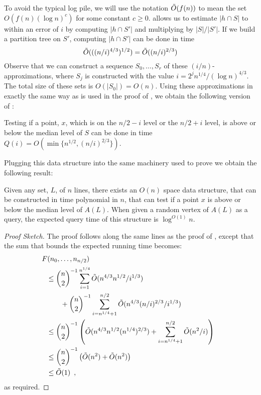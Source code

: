 \documentclass{cccg12}
\begin{document}
To avoid the typical log pile, we will use the notation $\tilde{O}(f(n))$
to mean the set $O(f(n)(\log n)^c)$ for some constant $c \ge 0$.
 allows us to estimate $|h\cap S|$ to within an error
of $i$ by computing $|h\cap S'|$ and multiplying by $|S|/|S'|$.  If we
build a partition tree on $S'$, computing $|h\cap S'|$ can be done in time
\[
 \tilde{O}(((n/i)^{4/3})^{1/2}) 
    = \tilde{O}((n/i)^{2/3})
\]
Observe that we can construct a sequence $S_0,\ldots,S_r$ of these
$(i/n)$-approximations, where $S_j$ is constructed with the
value $i=2^jn^{1/4}/(\log n)^{4/3}$.  The total size of these sets is
$O(|S_0|)=O(n)$.  Using these approximations in exactly the same way
as  is used in the proof of ,
we obtain the following version of :

\begin{lem}
  Testing if a point, $x$, which is on the $n/2-i$ level or the $n/2+i$
  level, is above or below the median level of $S$ can be done in time
  $Q(i) = O(\min\{n^{1/2},(n/i)^{2/3}\})$.
\end{lem}

Plugging this data structure into the same machinery used to prove
 we obtain the following result:

\begin{thm}
  Given any set, $L$, of $n$ lines, there exists an $O(n)$ space data
  structure, that can be constructed in time polynomial in $n$, that
  can test if a point $x$ is above or below the median level of $A(L)$.
  When given a random vertex of $A(L)$ as a query, the expected query
  time of this structure is $\log^{O(1)} n$.
\end{thm}

\begin{proof}[Proof Sketch]
  The proof follows along the same lines as the proof of
  , except that the sum that bounds the expected
  running time becomes:
  \begin{align*}
     & \!\!\!\! F(n_0,\ldots,n_{n/2}) \\
       & \le \binom{n}{2}^{-1}\sum_{i=1}^{n^{1/4}}\tilde{O}(n^{4/3}n^{1/2}/i^{1/3}) \\
      & \qquad {} + \binom{n}{2}^{-1}\sum_{i=n^{1/4}+1}^{n/2}\tilde{O}(n^{4/3}(n/i)^{2/3}/i^{1/3}) \\
     & \le \binom{n}{2}^{-1}\left(\tilde{O}(n^{4/3}n^{1/2}(n^{1/4})^{2/3})
      + \sum_{i=n^{1/4}+1}^{n/2}\tilde{O}(n^{2}/i) \right) \\
     & \le \binom{n}{2}^{-1}\left(\tilde{O}(n^2) + \tilde{O}(n^{2}) \right) \\
     & \le \tilde{O}(1) \enspace ,
  \end{align*}
  as required.
\end{proof}
\end{document}

